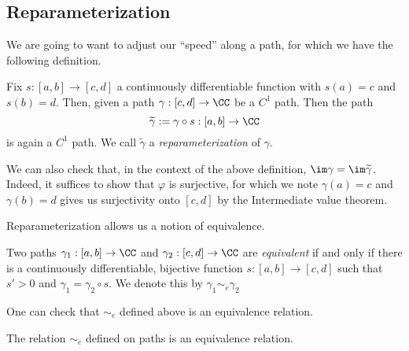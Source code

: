 \subsection{Reparameterization}
We are going to want to adjust our ``speed'' along a path, for which we have the following definition.
\begin{definition}[Reparameterization]
	Fix $s:[a,b]\to[c,d]$ a continuously differentiable function with $s(a)=c$ and $s(b)=d$. Then, given a path $\gamma:[c,d]\to\CC$ be a $C^1$ path. Then the path
	\[\widetilde\gamma:=\gamma\circ s:[a,b]\to\CC\]
	is again a $C^1$ path. We call $\widetilde{\gamma}$ a \textit{reparameterization} of $\gamma$.
\end{definition}
\begin{remark}
	We can also check that, in the context of the above definition, $\im\gamma=\im\widetilde{\gamma}$. Indeed, it suffices to show that $\varphi$ is surjective, for which we note $\gamma(a)=c$ and $\gamma(b)=d$ gives us surjectivity onto $[c,d]$ by the Intermediate value theorem.
\end{remark}
Reparameterization allows us a notion of equivalence.
\begin{definition}[Equivalent]
	Two paths $\gamma_1:[a,b]\to\CC$ and $\gamma_2:[c,d]\to\CC$ are \textit{equivalent} if and only if there is a continuously differentiable, bijective function $s:[a,b]\to[c,d]$ such that $s'>0$ and $\gamma_1=\gamma_2\circ s$. We denote this by $\gamma_1\sim_e\gamma_2$
\end{definition}
One can check that $\sim_e$ defined above is an equivalence relation.
\begin{lemma}
	The relation $\sim_e$ defined on paths is an equivalence relation.
\end{lemma}
